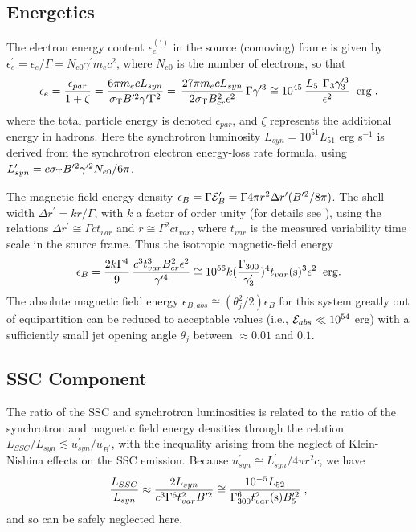 \subsection{Energetics}
The electron energy content $\epsilon_e^{(\prime)}$ in the source
(comoving) frame is given by $\epsilon_e^\prime = \epsilon_e/\Gamma =
N_{e0}\gamma^\prime m_ec^2$, where $N_{e0}$ is the number of
electrons, so that
\begin{equation}
\epsilon_e = {\epsilon_{par}\over 1+\zeta}
 = 
{6\pi m_ec L_{syn}\over \sigma_{\rm T} B^{\prime 2} \gamma^\prime \Gamma^2}
=
\,{27 \pi m_ec L_{syn}\over 2  \sigma_{\rm T} B_{cr}^2 \epsilon^2}
\,\Gamma\gamma^{\prime 3}
 \cong 
10^{45} \, {L_{51} \Gamma_3 \gamma_3^{\prime 3}\over \epsilon^{2}}\;\;{\rm erg}\;, 
\label{Epar}
\end{equation}
where the total particle energy is denoted $\epsilon_{par} $, and
$\zeta$ represents the additional energy in hadrons. Here the
synchrotron luminosity $L_{syn}=10^{51}L_{51}$ erg s$^{-1}$ is derived
from the synchrotron electron energy-loss rate formula, using
$L^\prime_{syn} = c \sigma_{\rm T} B^{\prime 2}\gamma^{\prime
  2}N_{e0}/6\pi$.

The magnetic-field energy density $\epsilon_B = \Gamma {\cal
  E}_B^\prime = \Gamma 4\pi r^2 \Delta r^\prime (B^{\prime 2}/8\pi)$.
The shell width $\Delta r^\prime = k r/\Gamma$, with $k$ a factor of
order unity (for details see \cite{2013ApJ...769...69B}), using the
relations $\Delta r^\prime \cong \Gamma c t_{var}$ and $r \cong
\Gamma^2 c t_{var}$, where $t_{var}$ is the measured variability time
scale in the source frame. Thus the isotropic magnetic-field energy
\begin{equation}
\epsilon_{B} = {2k \Gamma^4\over 9}\, {c^3 t_{var}^3 B_{cr}^2 \epsilon^2\over \gamma^{\prime 4}} \cong 
10^{56}  k({\Gamma_{300}\over \gamma_3^{\prime}})^4 t_{var}({\rm s})^3 \epsilon^{2}\;\;{\rm erg}.
\label{eq:EB}
\end{equation}
The absolute magnetic field energy $\epsilon_{B,abs} \cong
(\theta_j^2/2)\epsilon_{B}$ for this system greatly out of
equipartition can be reduced to acceptable values (i.e., ${\cal
  E}_{abs}\ll 10^{54}$ erg) with a sufficiently small jet opening
angle $\theta_j$ between $\approx 0.01$ and $0.1$.


\subsection{SSC Component}
The ratio of the SSC and synchrotron luminosities is related to the
ratio of the synchrotron and magnetic field energy densities through
the relation $L_{SSC}/L_{syn} \lesssim
u^\prime_{syn}/u^\prime_{B^\prime}$, with the inequality arising from
the neglect of Klein-Nishina effects on the SSC emission.  Because
$u^\prime_{syn} \cong L^\prime_{syn}/4\pi r^2 c$, we have
\begin{equation}
{L_{SSC}\over L_{syn}} \approx {2 L_{syn}\over c^3 \Gamma^6 t_{var}^2 B^{\prime 2}} \cong {10^{-5}  L_{52}\over \Gamma_{300}^6 t_{var}^2({\rm s}) B^{\prime 2}_5 } \;,
\label{SSCsynratio}
\end{equation}
and so can be safely neglected here.



